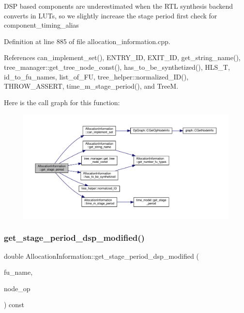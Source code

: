 D\+SP based components are underestimated when the R\+TL synthesis backend converts in L\+U\+Ts, so we slightly increase the stage period first check for component\+\_\+timing\+\_\+alias 

Definition at line 885 of file allocation\+\_\+information.\+cpp.



References can\+\_\+implement\+\_\+set(), E\+N\+T\+R\+Y\+\_\+\+ID, E\+X\+I\+T\+\_\+\+ID, get\+\_\+string\+\_\+name(), tree\+\_\+manager\+::get\+\_\+tree\+\_\+node\+\_\+const(), has\+\_\+to\+\_\+be\+\_\+synthetized(), H\+L\+S\+\_\+T, id\+\_\+to\+\_\+fu\+\_\+names, list\+\_\+of\+\_\+\+FU, tree\+\_\+helper\+::normalized\+\_\+\+I\+D(), T\+H\+R\+O\+W\+\_\+\+A\+S\+S\+E\+RT, time\+\_\+m\+\_\+stage\+\_\+period(), and TreeM.

Here is the call graph for this function\+:
\nopagebreak
\begin{figure}[H]
\begin{center}
\leavevmode
\includegraphics[width=350pt]{d7/d79/classAllocationInformation_add4fe4a7eb335ce5e8de39e7637ff791_cgraph}
\end{center}
\end{figure}
\mbox{\label{classAllocationInformation_aa7b6b9949f60f144839b167b83711994}} 
\subsubsection{\texorpdfstring{get\+\_\+stage\+\_\+period\+\_\+dsp\+\_\+modified()}{get\_stage\_period\_dsp\_modified()}}
{\footnotesize\ttfamily double Allocation\+Information\+::get\+\_\+stage\+\_\+period\+\_\+dsp\+\_\+modified (\begin{DoxyParamCaption}\item[{const unsigned int}]{fu\+\_\+name,  }\item[{const \hyperlink{technology__node_8hpp_a33dd193b7bd6b987bf0d8a770a819fa7}{technology\+\_\+node\+Ref} \&}]{node\+\_\+op }\end{DoxyParamCaption}) const\hspace{0.3cm}{\ttfamily [private]}}



